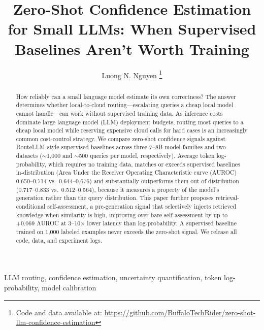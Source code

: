 \documentclass[journal]{IEEEtran}
\begin{document}
\title{Zero-Shot Confidence Estimation for Small LLMs: When Supervised Baselines Aren't Worth Training}

\author{Luong N. Nguyen
\thanks{Code and data available at: \url{https://github.com/BuffaloTechRider/zero-shot-llm-confidence-estimation}}}


\maketitle

\begin{abstract}
How reliably can a small language model estimate its own correctness? The answer determines whether local-to-cloud routing---escalating queries a cheap local model cannot handle---can work without supervised training data. As inference costs dominate large language model (LLM) deployment budgets, routing most queries to a cheap local model while reserving expensive cloud calls for hard cases is an increasingly common cost-control strategy. We compare zero-shot confidence signals against RouteLLM-style supervised baselines across three 7--8B model families and two datasets (${\sim}$1,000 and ${\sim}$500 queries per model, respectively). Average token log-probability, which requires no training data, matches or exceeds supervised baselines in-distribution (Area Under the Receiver Operating Characteristic curve (AUROC) 0.650--0.714 vs.\ 0.644--0.676) and substantially outperforms them out-of-distribution (0.717--0.833 vs.\ 0.512--0.564), because it measures a property of the model's generation rather than the query distribution. This paper further proposes retrieval-conditional self-assessment, a pre-generation signal that selectively injects retrieved knowledge when similarity is high, improving over bare self-assessment by up to +0.069 AUROC at 3--10$\times$ lower latency than log-probability. A supervised baseline trained on 1,000 labeled examples never exceeds the zero-shot signal. We release all code, data, and experiment logs.
\end{abstract}

\begin{IEEEkeywords}
LLM routing, confidence estimation, uncertainty quantification, token log-probability, model calibration
\end{IEEEkeywords}

\end{document}
